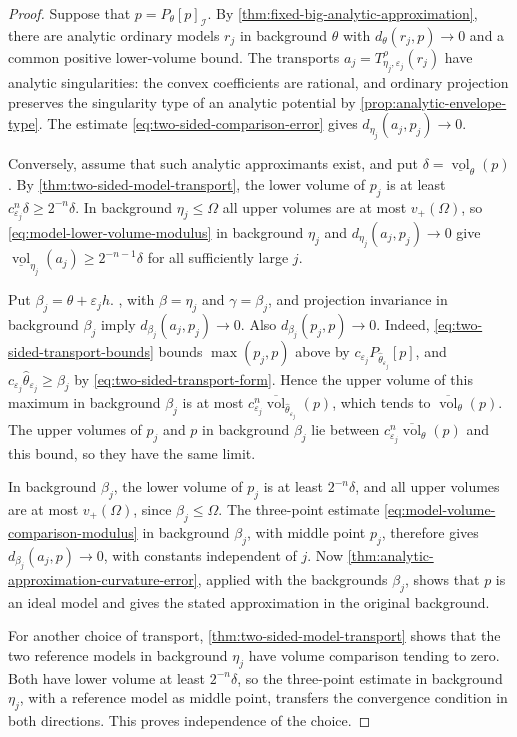 \begin{proof}
Suppose that $p=P_\theta[p]_{\mathcal I}$. By \cref{thm:fixed-big-analytic-approximation}, there are analytic ordinary models $r_j$ in background $\theta$ with $d_\theta(r_j,p)\to0$ and a common positive lower-volume bound. The transports $a_j=T^\rho_{\eta_j,\varepsilon_j}(r_j)$ have analytic singularities: the convex coefficients are rational, and ordinary projection preserves the singularity type of an analytic potential by \cref{prop:analytic-envelope-type}. The estimate \eqref{eq:two-sided-comparison-error} gives $d_{\eta_j}(a_j,p_j)\to0$.

Conversely, assume that such analytic approximants exist, and put $\delta=\underline{\operatorname{vol}}_\theta(p)$. By \cref{thm:two-sided-model-transport}, the lower volume of $p_j$ is at least $c_{\varepsilon_j}^n\delta\geq2^{-n}\delta$. In background $\eta_j\leq\Omega$ all upper volumes are at most $v_+(\Omega)$, so \eqref{eq:model-lower-volume-modulus} in background $\eta_j$ and $d_{\eta_j}(a_j,p_j)\to0$ give $\underline{\operatorname{vol}}_{\eta_j}(a_j)\geq2^{-n-1}\delta$ for all sufficiently large $j$.

Put $\beta_j=\theta+\varepsilon_jh$. , with $\beta=\eta_j$ and $\gamma=\beta_j$, and projection invariance in background $\beta_j$ imply $d_{\beta_j}(a_j,p_j)\to0$. Also $d_{\beta_j}(p_j,p)\to0$. Indeed, \eqref{eq:two-sided-transport-bounds} bounds $\max(p_j,p)$ above by $c_{\varepsilon_j}P_{\widehat\theta_{\varepsilon_j}}[p]$, and $c_{\varepsilon_j}\widehat\theta_{\varepsilon_j}\geq\beta_j$ by \eqref{eq:two-sided-transport-form}. Hence the upper volume of this maximum in background $\beta_j$ is at most $c_{\varepsilon_j}^n\overline{\operatorname{vol}}_{\widehat\theta_{\varepsilon_j}}(p)$, which tends to $\overline{\operatorname{vol}}_\theta(p)$. The upper volumes of $p_j$ and $p$ in background $\beta_j$ lie between $c_{\varepsilon_j}^n\overline{\operatorname{vol}}_\theta(p)$ and this bound, so they have the same limit.

In background $\beta_j$, the lower volume of $p_j$ is at least $2^{-n}\delta$, and all upper volumes are at most $v_+(\Omega)$, since $\beta_j\leq\Omega$. The three-point estimate \eqref{eq:model-volume-comparison-modulus} in background $\beta_j$, with middle point $p_j$, therefore gives $d_{\beta_j}(a_j,p)\to0$, with constants independent of $j$. Now \cref{thm:analytic-approximation-curvature-error}, applied with the backgrounds $\beta_j$, shows that $p$ is an ideal model and gives the stated approximation in the original background.

For another choice of transport, \cref{thm:two-sided-model-transport} shows that the two reference models in background $\eta_j$ have volume comparison tending to zero. Both have lower volume at least $2^{-n}\delta$, so the three-point estimate in background $\eta_j$, with a reference model as middle point, transfers the convergence condition in both directions. This proves independence of the choice.
\end{proof}

